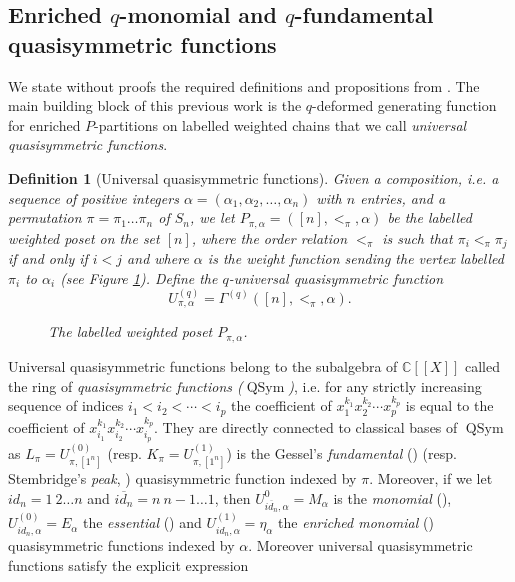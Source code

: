\documentclass[submission]{FPSAC2023}
\newtheorem{defn}{Definition}
\newcommand{\al}{\alpha}
\newcommand{\CC}{\mathbb{C}} %
\newcommand{\QSym}{\operatorname{QSym}}
\begin{document}
\subsection{Enriched $q$-monomial and $q$-fundamental quasisymmetric functions}
We state without proofs the required definitions and propositions from \cite{GriVas22}. The main building block of this previous work is the $q$-deformed generating function for enriched $P$-partitions on labelled weighted chains that we call \emph{universal quasisymmetric functions}. 
\begin{defn}[Universal quasisymmetric functions]
Given a \emph{composition}, i.e. a sequence of positive integers $\alpha = (\alpha_1, \alpha_2, \ldots, \alpha_n)$ with $n$ entries, and a permutation $\pi=\pi_1\dots\pi_n$ of $S_n$, we let $P_{\pi,\alpha} = ([n],<_\pi,\alpha)$ be the labelled weighted poset on the set $[n]$, where the order relation $<_\pi$ is such that $\pi_i <_\pi \pi_j$ if and only if $i < j$ and where $\alpha$ is the weight function sending the vertex labelled $\pi_i$ to $\alpha_i$ (see Figure \ref{fig : monomial}).
Define the \emph{$q$-universal quasisymmetric function}
\begin{equation*}
U^{(q)}_{\pi,\alpha} = \Gamma^{(q)}([n],<_\pi, \alpha).
\end{equation*}
\begin{figure}[htbp]
\begin{center}
\end{center}
\caption{The labelled weighted poset $P_{\pi,\alpha}$.}
\label{fig : monomial}
\end{figure}
\end{defn}
\noindent Universal quasisymmetric functions belong to the subalgebra of $\CC \left[\left[ X \right]\right]$ called the ring of \emph{quasisymmetric functions ($\QSym$)}, i.e. for any strictly increasing sequence of indices $i_1 < i_2 <\cdots< i_p$ the coefficient of $x_1^{k_1}x_2^{k_2}\cdots x_p^{k_p}$ is equal to the coefficient of $x_{i_1}^{k_1}x_{i_2}^{k_2}\cdots x_{i_p}^{k_p}$. They are directly connected to classical bases of $\QSym$ as $L_{\pi}= U^{(0)}_{\pi,[1^n]}$ (resp. $K_{\pi}= U^{(1)}_{\pi,[1^n]}$) is the Gessel's  \emph{fundamental} (\cite{Ges84})  (resp. Stembridge's  \emph{peak}, \cite{Ste97}) quasisymmetric function indexed by $\pi$. Moreover, if we let $id_{n} = 1~2\dots n $ and $\overline{id_{n}} = n~n-1\dots 1$, then $U^{0}_{\overline{id_{n}},\alpha} = M_\al$ is the \emph{monomial}  (\cite{Ges84}), $U^{(0)}_{id_{n},\alpha} = E_\al$ the \emph{essential}  (\cite{Hof15})  and $U^{(1)}_{id_{n},\alpha} = \eta_\al$ the \emph{enriched monomial}  (\cite{Hsi07, GriVas21}) quasisymmetric functions indexed by $\al$. Moreover universal quasisymmetric functions satisfy the explicit expression
\end{document}
